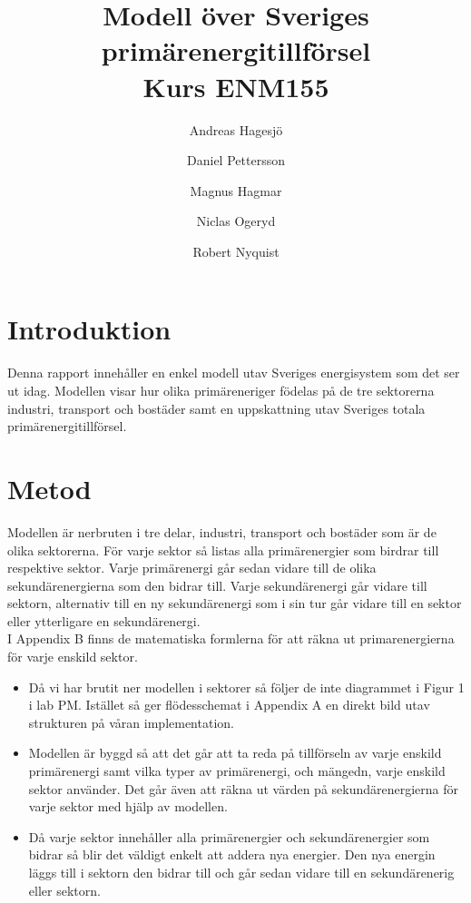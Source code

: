 \documentclass[a4paper,11pt,fleqn, titlepage]{article}
\author{Andreas Hagesjö \and Daniel Pettersson \and
Magnus Hagmar \and Niclas Ogeryd \and Robert Nyquist}
\title{Modell över Sveriges primärenergitillförsel \\ Kurs ENM155}
\begin{document}
\maketitle

\section{Introduktion}
Denna rapport innehåller en enkel modell utav Sveriges energisystem som det ser ut idag.
Modellen visar hur olika primäreneriger födelas på de tre sektorerna industri, transport och bostäder samt en uppskattning utav Sveriges totala primärenergitillförsel.


\section{Metod}
Modellen är nerbruten i tre delar, industri, transport och bostäder som är de olika sektorerna.
För varje sektor så listas alla primärenergier som birdrar till respektive sektor. Varje primärenergi går sedan vidare till de olika sekundärenergierna som den bidrar till. Varje sekundärenergi går vidare till sektorn, alternativ till en ny sekundärenergi som i sin tur går vidare till en sektor eller ytterligare en sekundärenergi. \\
I Appendix B finns de matematiska formlerna för att räkna ut primarenergierna för varje enskild sektor.


\begin{itemize}
\item Då vi har brutit ner modellen i sektorer så följer de inte diagrammet i Figur 1 i lab PM.
Istället så ger flödesschemat i Appendix A en direkt bild utav strukturen på våran implementation.


\item Modellen är byggd så att det går att ta reda på tillförseln av varje enskild primärenergi samt vilka typer av primärenergi, och mängedn, varje enskild sektor använder.
Det går även att räkna ut värden på sekundärenergierna för varje sektor med hjälp av modellen.

\item Då varje sektor innehåller alla primärenergier och sekundärenergier som bidrar så blir det väldigt enkelt att addera nya energier.
Den nya energin läggs till i sektorn den bidrar till och går sedan vidare till en sekundärenerig eller sektorn.
\end{itemize}

\newpage
\end{document}
